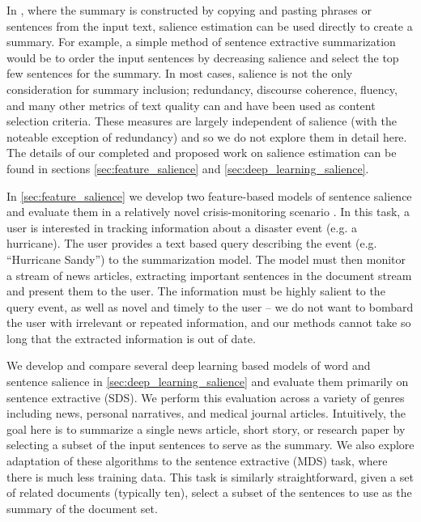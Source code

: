 In , 
where the summary is constructed by copying and pasting phrases or sentences 
from the input text, salience estimation can be used directly to create
a summary. For example, a simple method of sentence extractive summarization
would be to order the input sentences by decreasing salience and select the
top few sentences for the summary. In most cases, salience is not the only
consideration for summary inclusion; redundancy, discourse coherence, fluency,
and many other metrics of text quality can and have been used as content
selection criteria. These measures are largely independent of salience 
(with the noteable exception of redundancy) and so we do not explore them in 
detail here. The details of our completed and proposed work on 
salience estimation can be found
in sections \ref{sec:feature_salience} and \ref{sec:deep_learning_salience}.

In \autoref{sec:feature_salience} we develop two feature-based models of 
sentence
salience and evaluate them in a relatively novel  crisis-monitoring scenario
\citep{starbird2013working,aslam2015trec,aslam2016trec}. In this task, a user is interested
in tracking information about a disaster event (e.g. a hurricane). The
user provides a text based query describing the event 
(e.g. ``Hurricane Sandy'') to the summarization model. 
The model must then 
monitor a stream of news articles, extracting important sentences in the 
document stream and present them to the user. The information must be 
highly salient to the query event, as well as novel and timely to the user 
-- we do not want to bombard the user with irrelevant or repeated information,
and our methods cannot take so long  that the extracted
information is out of date.
  
We develop and compare several deep learning based models of word and 
sentence salience in \autoref{sec:deep_learning_salience} and evaluate them 
primarily on
sentence extractive  (SDS). 
We perform this evaluation across
a variety of genres including news, personal narratives, and medical journal
articles. Intuitively, the goal here is to summarize a single news article, 
short story, or research paper by selecting a subset of the input sentences
to serve as the summary. We also explore adaptation of these algorithms to 
the sentence extractive  (MDS) task, 
where there is much less training data.
This task is similarly straightforward, given a set of related documents 
(typically ten), select a subset of the sentences to use as the summary of
the document set.

